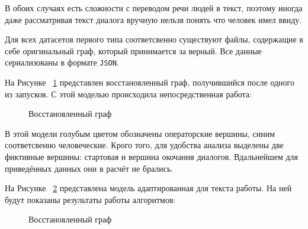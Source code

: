 \documentclass[times,specification,annotation]{itmo-student-thesis}
\begin{document}
	В обоих случаях есть сложности с переводом речи людей в текст, поэтому иногда даже рассматривая текст диалога вручную нельзя понять что человек имел ввиду.
	
	Для всех датасетов первого типа соответсвенно существуют файлы, содержащие в себе оригинальный граф, который принимается за верный. Все данные сериализованы в формате \texttt{JSON}. 
	
	На Рисунке ~\ref{fig:usual:graph} представлен восстановленный граф, получившийся после одного из запусков. С этой моделью происходила непосредственная работа:
	
	\begin{figure}[H]
		\caption{Восстановленный граф}
		\label{fig:usual:graph}
	\end{figure}

	В этой модели голубым цветом обозначены операторские вершины, синим соответсвенно человеческие. Крого того, для удобства анализа выделены две фиктивные вершины: стартовая и вершина окочания диалогов. Вдальнейшем для приведённых данных они в расчёт не брались.
	
	На Рисунке ~\ref{fig:adapt:graph} представлена модель адаптированная для текста работы. На ней будут показаны результаты работы алгоритмов:
	
	\begin{figure}[H]
		\caption{Восстановленный граф}
		\label{fig:adapt:graph}
	\end{figure}
\end{document}

